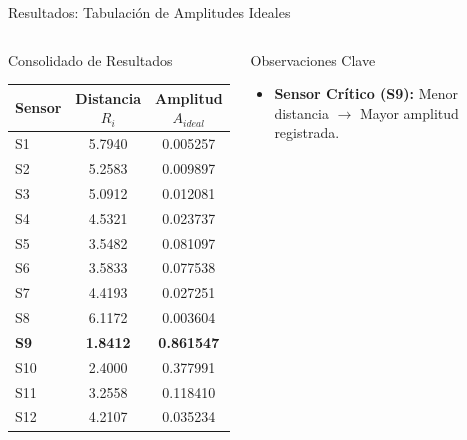 
\begin{frame}{Resultados: Tabulación de Amplitudes Ideales}

    \begin{columns}[T]
        \begin{block}{Consolidado de Resultados}
            \centering
            \scriptsize 
            \begin{tabular}{@{}lcc@{}}
                \toprule
                \textbf{Sensor} & \textbf{Distancia $R_i$} & \textbf{Amplitud $A_{ideal}$} \\ \midrule
                S1  & 5.7940 & 0.005257 \\
                S2  & 5.2583 & 0.009897 \\
                S3  & 5.0912 & 0.012081 \\
                S4  & 4.5321 & 0.023737 \\
                S5  & 3.5482 & 0.081097 \\
                S6  & 3.5833 & 0.077538 \\
                S7  & 4.4193 & 0.027251 \\
                S8  & 6.1172 & 0.003604 \\
                \textbf{S9} & \textbf{1.8412} & \textbf{0.861547} \\
                S10 & 2.4000 & 0.377991 \\
                S11 & 3.2558 & 0.118410 \\
                S12 & 4.2107 & 0.035234 \\ 
                \bottomrule
            \end{tabular}
        \end{block}

        \vspace{0.4cm}
        
        \begin{block}{Observaciones Clave}
            \scriptsize
            \begin{itemize}
                \item \textbf{Sensor Crítico (S9):} Menor distancia $\rightarrow$ Mayor amplitud registrada.
                

\end{itemize}
\end{block}
\end{columns}
\end{frame}
